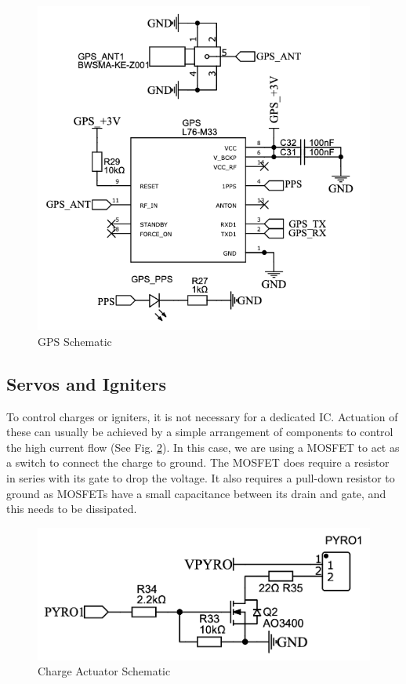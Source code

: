 \documentclass[conf]{new-aiaa}
\begin{document}
\begin{figure}[H]
    \centering
    \includegraphics[scale=0.35]{gps_schematic.png}
    \caption{GPS Schematic}
    \label{fig:gps_schematic}
\end{figure}

\pagebreak
\subsection{Servos and Igniters}

To control charges or igniters, it is not necessary for a dedicated IC. Actuation of these can usually be achieved by a simple arrangement of components to control the high current flow (See Fig. \ref{fig:pyro_schematic}). In this case, we are using a MOSFET to act as a switch to connect the charge to ground. The MOSFET does require a resistor in series with its gate to drop the voltage. It also requires a pull-down resistor to ground as MOSFETs have a small capacitance between its drain and gate, and this needs to be dissipated\cite{ao3400}.

\begin{figure}[H]
    \centering
    \includegraphics[scale=0.25]{pyro_schematic.png}
    \caption{Charge Actuator Schematic}
    \label{fig:pyro_schematic}
\end{figure}
\end{document}
